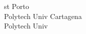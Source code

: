 \documentclass[a4paper]{article}
\begin{document}
\begin{multicols*}{2}
\begin{footnotesize}
st Porto \\ Polytech Univ Cartagena \\ Polytech Univ 
\end{footnotesize}
\end{multicols*}
\end{document}

